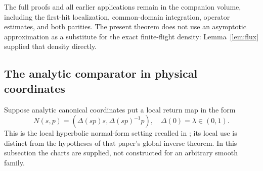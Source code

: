 The full proofs and all earlier applications remain in the companion
volume, including the first-hit localization, common-domain integration,
operator estimates, and both parities. The present theorem does not
use an asymptotic approximation as a substitute for the exact
finite-flight density: Lemma~\ref{lem:flux} supplied that density
directly.

\subsection{The analytic comparator in physical coordinates}
Suppose analytic canonical coordinates put a local return map in the
form
\begin{equation}\label{eq:normalform}
 N(s,p)=(\Delta(sp)s,\Delta(sp)^{-1}p),\quad
                   \Delta(0)=\lambda\in(0,1).
\end{equation}
This is the local hyperbolic normal-form setting recalled in
\cite[Section 2]{DSKL}; its local use is distinct from the hypotheses
of that paper's global inverse theorem. In this subsection the charts
are supplied, not constructed for an arbitrary smooth family.

